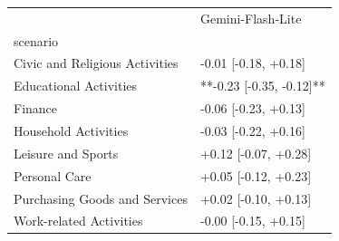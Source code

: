 \begin{tabular}{ll}
\toprule
 & Gemini-Flash-Lite \\
scenario &  \\
\midrule
Civic and Religious Activities & -0.01 [-0.18, +0.18] \\
Educational Activities & **-0.23 [-0.35, -0.12]** \\
Finance & -0.06 [-0.23, +0.13] \\
Household Activities & -0.03 [-0.22, +0.16] \\
Leisure and Sports & +0.12 [-0.07, +0.28] \\
Personal Care & +0.05 [-0.12, +0.23] \\
Purchasing Goods and Services & +0.02 [-0.10, +0.13] \\
Work-related Activities & -0.00 [-0.15, +0.15] \\
\bottomrule
\end{tabular}
